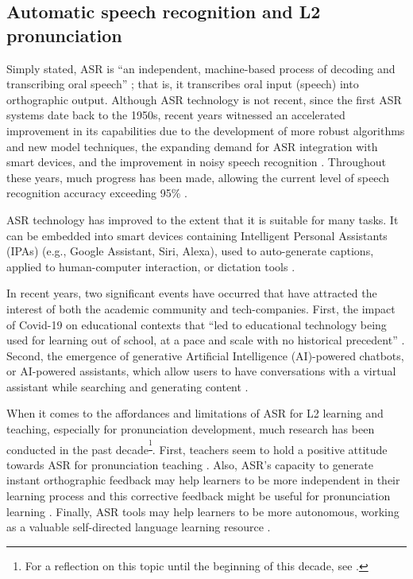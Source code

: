 \documentclass[english]{textolivre}
\begin{document}
\subsection{Automatic speech recognition and L2
pronunciation}\label{sec-automatic}


Simply stated, ASR is ``an independent, machine-based process of
decoding and transcribing oral speech'' \cite[p.~149]{levis2020b}; that
is, it transcribes oral input (speech) into orthographic output.
Although ASR technology is not recent, since the first ASR systems date
back to the 1950s, recent years witnessed an accelerated improvement in
its capabilities due to the development of more robust algorithms and
new model techniques, the expanding demand for ASR integration with
smart devices, and the improvement in noisy speech recognition
\cite{jurafsky2024,levis2020b}. Throughout these years, much progress
has been made, allowing the current level of speech recognition accuracy
exceeding 95\% \cite{cardoso2022}.

ASR technology has improved to the extent that it is suitable for many
tasks. It can be embedded into smart devices containing Intelligent
Personal Assistants (IPAs) (e.g., Google Assistant, Siri, Alexa), used
to auto-generate captions, applied to human-computer interaction, or
dictation tools \cite{jurafsky2024,vanlieshout2022}.

In recent years, two significant events have occurred that have
attracted the interest of both the academic community and
tech-companies. First, the impact of Covid-19 on educational contexts
that ``led to educational technology being used for learning out of
school, at a pace and scale with no historical precedent''
\cite[p.~13]{unesco2023}. Second, the emergence of generative Artificial
Intelligence (AI)-powered chatbots, or AI-powered assistants, which
allow users to have conversations with a virtual assistant while
searching and generating content \cite{ibm2024}.

When it comes to the affordances and limitations of ASR for L2 learning
and teaching, especially for pronunciation development, much research
has been conducted in the past decade\textsuperscript{\footnote{For a
  reflection on this topic until the beginning of this decade, see \textcite{gottardi2022}.}}. First, teachers seem to hold a
positive attitude towards ASR for pronunciation teaching
\cite{gottardi2024}. Also, ASR's capacity to generate instant
orthographic feedback may help learners to be more independent in their
learning process and this corrective feedback might be useful for
pronunciation learning \cite{liakina2022}. Finally, ASR tools may help
learners to be more autonomous, working as a valuable self-directed
language learning resource \cite{cardoso2022}.
\end{document}
